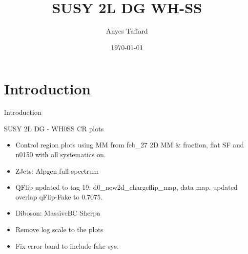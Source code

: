 \documentclass[10pt]{beamer}
\begin{document}

\newcommand{\METrel}{\ensuremath{E_\mathrm{T}^\mathrm{miss,rel}}}
\newcommand{\meff}{\ensuremath{m_{\mathrm{eff}}}}
\newcommand{\mt}{\ensuremath{m_\mathrm{T}}}
\newcommand{\pTmiss}{\ensuremath{\mathbf{p}_\mathrm{T}^\mathrm{miss}}}
\newcommand{\mll}{\ensuremath{m_{\ell\ell}}}
\newcommand{\pTll}{\ensuremath{p_\mathrm{T,\ell\ell}}}
\newcommand{\dphill}{\ensuremath{\Delta\phi_{\ell\ell}}}
\newcommand{\dRll}{\ensuremath{\Delta R_{\ell\ell}}}
\newcommand{\mjj}{\ensuremath{m_{jj}}}
\newcommand{\mljj}{\ensuremath{m_{ljj}}}


\author{Anyes Taffard}
\date{\today}

\title[SUSY 2L WH SS ]{SUSY 2L DG WH-SS}

\begin{frame}[plain]
  \titlepage
\end{frame}

\section{Introduction}
\begin{frame}{Introduction}
  \begin{block}{SUSY 2L DG - WH0SS CR plots }
    \begin{itemize}
    \item Control region plots using MM from feb\_27 2D MM \& fraction, flat SF and n0150 with all systematics on.
    \item ZJets: Alpgen full spectrum
    \item QFlip updated to tag 19: d0\_new2d\_chargeflip\_map, data map. updated overlap qFlip-Fake to 0.7075.
    \item Diboson: MassiveBC Sherpa
    \item Remove log scale to the plots
    \item Fix error band to include fake sys. 
    \end{itemize}
  \end{block}
\end{frame}
\end{document}
